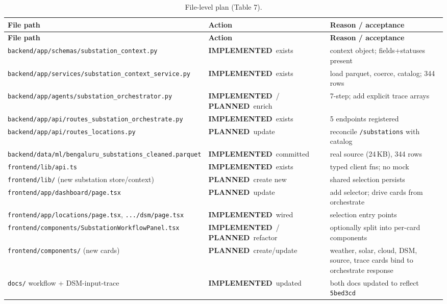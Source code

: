 \documentclass[11pt,a4paper]{article}
\newcommand{\stImpl}{\textcolor{cok}{\textbf{IMPLEMENTED}}}
\newcommand{\stPlan}{\textcolor{cplan}{\textbf{PLANNED}}}
\newcommand{\code}[1]{\texttt{\small #1}}
\begin{document}
\begin{footnotesize}
\begin{longtable}{@{}p{5.6cm}p{2.6cm}p{5.4cm}@{}}
\caption{File-level plan (Table 7).}\label{tab:files}\\
\toprule
\textbf{File path} & \textbf{Action} & \textbf{Reason / acceptance}\\
\midrule
\endfirsthead
\toprule
\textbf{File path} & \textbf{Action} & \textbf{Reason / acceptance}\\
\midrule
\endhead
\bottomrule
\endfoot
\code{backend/app/schemas/}\allowbreak\code{substation\_context.py} & \stImpl\ exists & context object; fields+statuses present\\
\code{backend/app/services/}\allowbreak\code{substation\_context\_service.py} & \stImpl\ exists & load parquet, coerce, catalog; 344 rows\\
\code{backend/app/agents/}\allowbreak\code{substation\_orchestrator.py} & \stImpl\ / \stPlan\ enrich & 7-step; add explicit trace arrays\\
\code{backend/app/api/}\allowbreak\code{routes\_substation\_orchestrate.py} & \stImpl\ exists & 5 endpoints registered\\
\code{backend/app/api/}\allowbreak\code{routes\_locations.py} & \stPlan\ update & reconcile \code{/substations} with catalog\\
\code{backend/data/ml/}\allowbreak\code{bengaluru\_substations\_cleaned.parquet} & \stImpl\ committed & real source (24\,KB), 344 rows\\
\code{frontend/lib/api.ts} & \stImpl\ exists & typed client fns; no mock\\
\code{frontend/lib/} (new substation store/context) & \stPlan\ create new & shared selection persists\\
\code{frontend/app/dashboard/}\allowbreak\code{page.tsx} & \stPlan\ update & add selector; drive cards from orchestrate\\
\code{frontend/app/locations/}\allowbreak\code{page.tsx}, \code{.../dsm/page.tsx} & \stImpl\ wired & selection entry points\\
\code{frontend/components/}\allowbreak\code{SubstationWorkflowPanel.tsx} & \stImpl\ / \stPlan\ refactor & optionally split into per-card components\\
\code{frontend/components/} (new cards) & \stPlan\ create/update & weather, solar, cloud, DSM, source, trace cards bind to orchestrate response\\
\code{docs/} workflow + DSM-input-trace & \stImpl\ updated & both docs updated to reflect \code{5bed3cd}\\
\bottomrule
\end{longtable}
\end{footnotesize}
\end{document}
